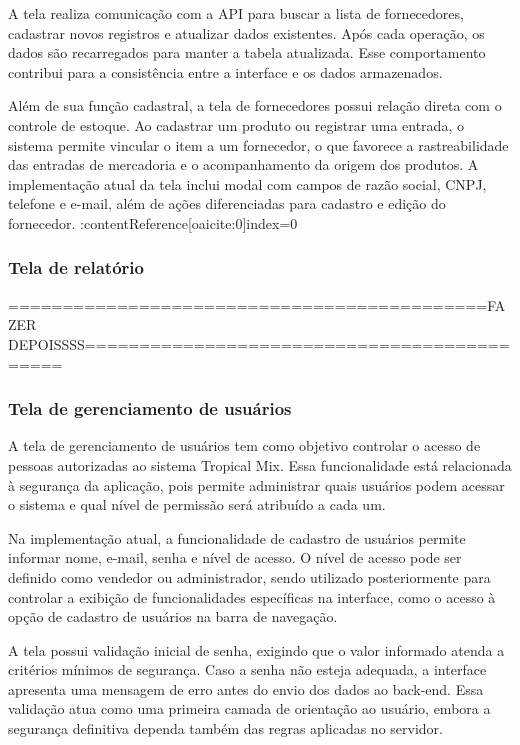 A tela realiza comunicação com a API para buscar a lista de fornecedores, cadastrar novos registros e atualizar dados existentes. Após cada operação, os dados são recarregados para manter a tabela atualizada. Esse comportamento contribui para a consistência entre a interface e os dados armazenados.

Além de sua função cadastral, a tela de fornecedores possui relação direta com o controle de estoque. Ao cadastrar um produto ou registrar uma entrada, o sistema permite vincular o item a um fornecedor, o que favorece a rastreabilidade das entradas de mercadoria e o acompanhamento da origem dos produtos. A implementação atual da tela inclui modal com campos de razão social, CNPJ, telefone e e-mail, além de ações diferenciadas para cadastro e edição do fornecedor. :contentReference[oaicite:0]{index=0}

\subsubsection{Tela de relatório}

============================================FAZER DEPOISSSS============================================

\subsubsection{Tela de gerenciamento de usuários}

A tela de gerenciamento de usuários tem como objetivo controlar o acesso de pessoas autorizadas ao sistema Tropical Mix. Essa funcionalidade está relacionada à segurança da aplicação, pois permite administrar quais usuários podem acessar o sistema e qual nível de permissão será atribuído a cada um.

Na implementação atual, a funcionalidade de cadastro de usuários permite informar nome, e-mail, senha e nível de acesso. O nível de acesso pode ser definido como vendedor ou administrador, sendo utilizado posteriormente para controlar a exibição de funcionalidades específicas na interface, como o acesso à opção de cadastro de usuários na barra de navegação.

A tela possui validação inicial de senha, exigindo que o valor informado atenda a critérios mínimos de segurança. Caso a senha não esteja adequada, a interface apresenta uma mensagem de erro antes do envio dos dados ao back-end. Essa validação atua como uma primeira camada de orientação ao usuário, embora a segurança definitiva dependa também das regras aplicadas no servidor.

